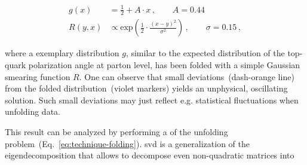 \begin{subequations}
\begin{align}
g(x)&=\frac{1}{2}+A\cdot x\,,\qquad A=0.44\\
R(y,x)&\propto\mathrm{exp}\left(\frac{1}{2}\cdot\frac{(x-y)^2}{\sigma^2}\right)\,,\qquad \sigma=0.15\,,
\end{align}
\label{eq:technique-unfolding-test-model}
\end{subequations}

where a exemplary distribution $g$, similar to the expected distribution of the top-quark polarization angle at parton level, has been folded with a simple Gaussian smearing function $R$. One can observe that small deviations~(dash-orange line) from the folded distribution~(violet markers) yields an unphysical, oscillating solution. Such small deviations may just reflect e.g. statistical fluctuations when unfolding data.


This result can be analyzed by performing a  of the unfolding problem~(Eq.~\ref{eq:technique-folding}). \Gls{svd} is a generalization of the eigendecomposition that allows to decompose even non-quadratic matrices into 

